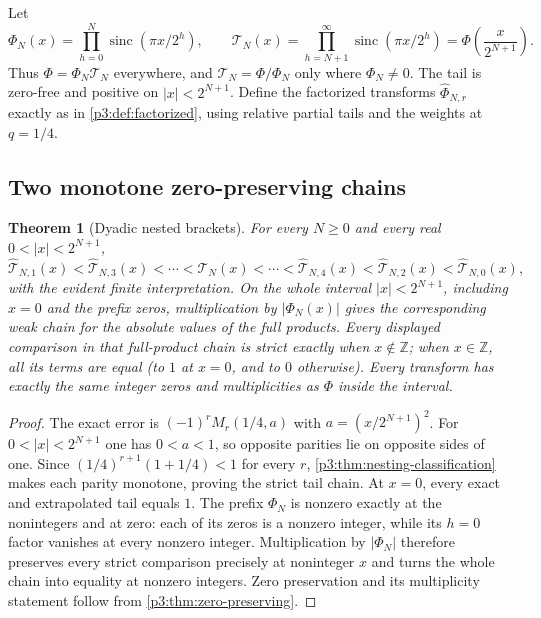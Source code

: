 \documentclass[11pt]{article}
\numberwithin{equation}{section}
\newtheorem{theorem}{Theorem}[section]
\theoremstyle{definition}
\theoremstyle{remark}
\newcommand{\Z}{\mathbb Z}
\newcommand{\sinc}{\operatorname{sinc}}
\begin{document}
Let
\begin{equation}
 \Phi_N(x)=\prod_{h=0}^{N}\sinc(\pi x/2^h),
 \qquad
 \mathcal T_N(x)=\prod_{h=N+1}^{\infty}\sinc(\pi x/2^h)
 =\Phi\!\left(\frac{x}{2^{N+1}}\right).
 \label{p3:eq:Phi-prefix-tail}
\end{equation}
Thus $\Phi=\Phi_N\mathcal T_N$ everywhere, and
$\mathcal T_N=\Phi/\Phi_N$ only where $\Phi_N\ne0$.  The tail is zero-free and positive on
$|x|<2^{N+1}$.  Define the factorized transforms
$\widehat\Phi_{N,r}$ exactly as in \cref{p3:def:factorized}, using relative partial tails and
the weights at $q=1/4$.

\subsection{Two monotone zero-preserving chains}

\begin{theorem}[Dyadic nested brackets]\label{p3:thm:dyadic-chains}
For every $N\ge0$ and every real $0<|x|<2^{N+1}$,
\begin{equation}
 \widehat{\mathcal T}_{N,1}(x)
 <\widehat{\mathcal T}_{N,3}(x)<\cdots
 <\mathcal T_N(x)
 <\cdots<\widehat{\mathcal T}_{N,4}(x)
 <\widehat{\mathcal T}_{N,2}(x)
 <\widehat{\mathcal T}_{N,0}(x),
 \label{p3:eq:tail-chains}
\end{equation}
with the evident finite interpretation.  On the whole interval $|x|<2^{N+1}$, including
$x=0$ and the prefix zeros, multiplication by $|\Phi_N(x)|$ gives the corresponding weak
chain for the absolute values of the full products.  Every displayed comparison in that
full-product chain is strict exactly when $x\notin\Z$; when $x\in\Z$, all its terms are equal
(to $1$ at $x=0$, and to $0$ otherwise).  Every transform has exactly the same integer zeros
and multiplicities as $\Phi$ inside the interval.
\end{theorem}

\begin{proof}
The exact error is $(-1)^rM_r(1/4,a)$ with
$a=(x/2^{N+1})^2$.  For $0<|x|<2^{N+1}$ one has $0<a<1$, so opposite parities lie on
opposite sides of one.  Since
$(1/4)^{r+1}(1+1/4)<1$ for every $r$, \cref{p3:thm:nesting-classification} makes each parity
monotone, proving the strict tail chain.  At $x=0$, every exact and extrapolated tail equals
$1$.  The prefix $\Phi_N$ is nonzero exactly at the nonintegers and at zero: each of its
zeros is a nonzero integer, while its $h=0$ factor vanishes at every nonzero integer.
Multiplication by $|\Phi_N|$ therefore preserves every strict comparison precisely at
noninteger $x$ and turns the whole chain into equality at nonzero integers.  Zero
preservation and its multiplicity statement follow from \cref{p3:thm:zero-preserving}.
\end{proof}
\end{document}
